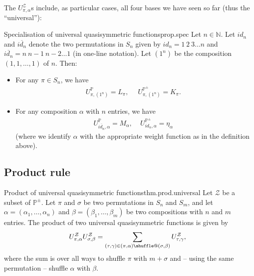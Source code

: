 \documentclass[numbers=enddot,12pt,final,onecolumn,notitlepage]{scrartcl}%
\makeatletter
\newcommand{\al}{\alpha}
\newcommand{\be}{\beta}
\newcommand{\NN}{\mathbb{N}} %
\newcommand{\PP}{\mathbb{P}} %
\providecommand*{\shuffle}{%
  \mathbin{\mathpalette\shuffle@{}}%
}
\newcommand*{\shuffle@}[2]{%
  \sbox0{$#1\vcenter{}$}%
  \kern .15\ht0 %
  \rlap{\vrule height .25\ht0 depth 0pt width 2.5\ht0}%
  \raise.1\ht0\hbox to 2.5\ht0{%
    \vrule height 1.75\ht0 depth -.1\ht0 width .17\ht0 %
    \hfill
    \vrule height 1.75\ht0 depth -.1\ht0 width .17\ht0 %
    \hfill
    \vrule height 1.75\ht0 depth -.1\ht0 width .17\ht0 %
  }%
  \kern .15\ht0 %
}
\newcommand{\tup}[1]{\left( #1 \right)}
\newcommand{\defn}[1]{{\color{darkred}\emph{#1}}}
\newcommand{\0}{\phantom{c}}
\let\sumnonlimits\sum
\renewcommand{\sum}{\sumnonlimits\limits}
\makeatother
\begin{document}
The $U^\mathcal{Z}_{\pi,\alpha}$s include, as particular cases, all four bases we have seen so far (thus the ``universal''):

\begin{proposition}{Specialisation of universal quasisymmetric functions}{prop.spec}
\indent Let $n \in \NN$. Let \defn{$id_{n}$} and \defn{$\overline{id_{n}}$} denote the two permutations in $S_n$ given by $id_{n} = 1~2~3\dots n$ and $\overline{id_{n}} = n~n-1~n-2\dots 1$ (in one-line notation). Let \defn{$(1^n)$} be the composition $\tup{1, 1, \ldots, 1}$ of $n$. Then:
\begin{itemize}
\item For any $\pi \in S_n$, we have
\begin{align*}
U^\mathcal{\PP}_{\pi,(1^n)} = L_\pi, ~~~~~~U^\mathcal{\PP^\pm}_{\pi,(1^n)} = K_\pi .
\end{align*}
\item For any composition $\alpha$ with $n$ entries, we have
\begin{align}
U^{\mathcal{\PP}}_{\overline{id_{n}},\alpha} = M_{\alpha},
~~~~~U^{\mathcal{\PP^\pm}}_{id_{n},\alpha} = \eta_{\alpha}
\label{eq : UE}
\end{align}
(where we identify $\alpha$ with the appropriate weight function as in the definition above).
\end{itemize}

\end{proposition}

\subsection{Product rule}
\begin{theorem}{Product of universal quasisymmetric functions}{thm.prod.universal}
Let $\mathcal{Z}$ be a subset of $\PP^{\pm}$.
Let $\pi$ and $\sigma$ be two permutations in $S_n$ and $S_m$, and let $\alpha = (\al_1,\dots,\al_n)$ and $\beta = (\be_1,\dots,\be_m)$ be two compositions with $n$ and $m$ entries.
The product of two universal quasisymmetric functions is given by
\begin{equation}
\label{eq : UU}
U^\mathcal{Z}_{\pi,\alpha}U^\mathcal{Z}_{\sigma,\beta}=\sum_{(\tau,\gamma)\in(\pi,\alpha)\shuffle(\sigma,\beta)}U^\mathcal{Z}_{\tau,\gamma} ,
\end{equation}
where the sum is over all ways to shuffle $\pi$ with $m + \sigma$ and -- using the same permutation -- shuffle $\alpha$ with $\beta$.
\end{theorem}
\end{document}
